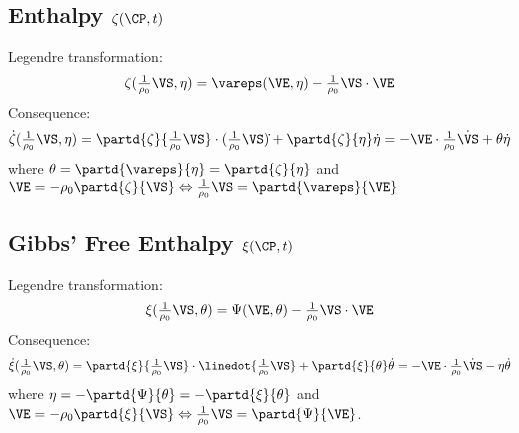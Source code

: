 \documentclass[a5paper,twosided,11pt,DIV=15,BCOR=0mm]{scrbook}
\newcommand{\veps}{\vareps}
\newcommand{\rhoz}{\tfrac{1}{\rho_0}}
\begin{document}
\subsection{Enthalpy $\zeta(\CP,t)$}
Legendre transformation:
\begin{equation}
  \zeta(\rhoz\VS,\eta) = \veps(\VE,\eta) - \rhoz\VS\cdot\VE
\end{equation}
Consequence:
\begin{equation}
\dot{\zeta}(\rhoz\VS,\eta) = \partd{\zeta}{\rhoz\VS}\cdot(\rhoz\VS)\dot{}
+\partd{\zeta}{\eta}\dot{\eta}
= - \VE \cdot \rhoz\dot{\VS}+\theta\dot{\eta}
\end{equation}
where $\theta=\partd{\veps}{\eta}=\partd{\zeta}{\eta}$ and
$\VE=-\rho_0\partd{\zeta}{\VS}\Leftrightarrow\rhoz\VS=\partd{\veps}{\VE}$
\subsection{Gibbs' Free Enthalpy $\xi(\CP,t)$}
Legendre transformation:
\begin{equation}
  \xi(\rhoz\VS,\theta)=\Psi(\VE,\theta)-\rhoz\VS\cdot\VE
\end{equation}
Consequence:
\begin{equation}
\textstyle
    \dot{\xi}(\rhoz\VS,\theta) =
    \partd{\xi}{\rhoz\VS}\cdot\linedot{\rhoz\VS}+\partd{\xi}{\theta}\dot{\theta}
    =-\VE\cdot\rhoz\dot{\VS}-\eta\dot{\theta}
\end{equation}
where $\eta=-\partd{\Psi}{\theta} = -\partd{\xi}{\theta}$ and
$\VE=-\rho_0\partd{\xi}{\VS}\Leftrightarrow\rhoz\VS=\partd{\Psi}{\VE}$.
\end{document}

